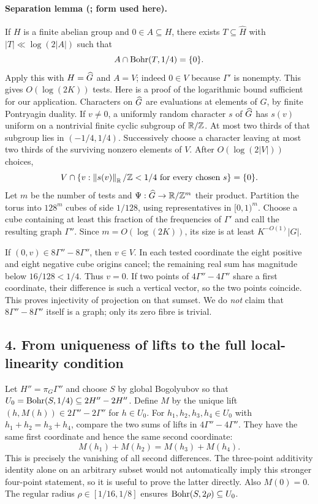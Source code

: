 \paragraph{Separation lemma (; form used here).}
If $H$ is a finite abelian group and $0\in A\subseteq H$, there exists
$T\subseteq\widehat H$ with $|T|\ll\log(2|A|)$ such that
\[A\cap\operatorname{Bohr}(T,1/4)=\{0\}.\]
Apply this with $H=\widehat G$ and $A=V$; indeed $0\in V$ because $\Gamma'$
is nonempty. This gives $O(\log(2K))$ tests. Here is a proof of the
logarithmic bound sufficient for our application.
Characters on $\widehat G$ are evaluations at elements of $G$, by finite
Pontryagin duality. If $v\ne0$, a uniformly random character $s$ of
$\widehat G$ has $s(v)$ uniform on a nontrivial finite cyclic subgroup of
$\mathbb R/\mathbb Z$. At most two thirds of that subgroup lies in $(-1/4,1/4)$.
Successively choose a character leaving at most two thirds of the surviving
nonzero elements of $V$. After $O(\log(2|V|))$ choices,
\[V\cap\{v:\left\|s(v)\right\|_\mathbb R/\mathbb Z<1/4\text{ for every chosen }s\}=\{0\}.\]
Let $m$ be the number of tests and $\Psi:\widehat G\to\mathbb R/\mathbb Z^m$ their product.
Partition the torus into $128^m$ cubes of side $1/128$, using
representatives in $[0,1)^m$. Choose a cube containing at least this
fraction of the frequencies of $\Gamma'$ and call the resulting graph
$\Gamma''$. Since $m=O(\log(2K))$, its size is at least
$K^{-O(1)}|G|$.

If $(0,v)\in8\Gamma''-8\Gamma''$, then $v\in V$. In each tested
coordinate the eight positive and eight negative cube origins cancel;
the remaining real sum has magnitude below $16/128<1/4$.
Thus $v=0$. If two points of $4\Gamma''-4\Gamma''$ share a first
coordinate, their difference is such a vertical vector, so the two
points coincide. This proves injectivity of projection on that sumset.
We do \emph{not} claim that $8\Gamma''-8\Gamma''$ itself is a graph;
only its zero fibre is trivial.

\subsection*{4. From uniqueness of lifts to the full local-linearity condition}
Let $H''=\pi_G\Gamma''$ and choose $S$ by global Bogolyubov so that
$U_0=\operatorname{Bohr}(S,1/4)\subseteq2H''-2H''$. Define $M$ by the unique
lift $(h,M(h))\in2\Gamma''-2\Gamma''$ for $h\in U_0$.
For $h_1,h_2,h_3,h_4\in U_0$ with $h_1+h_2=h_3+h_4$, compare the
two sums of lifts in $4\Gamma''-4\Gamma''$. They have the same first
coordinate and hence the same second coordinate:
\[M(h_1)+M(h_2)=M(h_3)+M(h_4).\]
This is precisely the vanishing of all second differences. The
three-point additivity identity alone on an arbitrary subset would not
automatically imply this stronger four-point statement, so it is useful
to prove the latter directly. Also $M(0)=0$. The regular radius
$\rho\in[1/16,1/8]$ ensures $\operatorname{Bohr}(S,2\rho)\subseteq U_0$.

